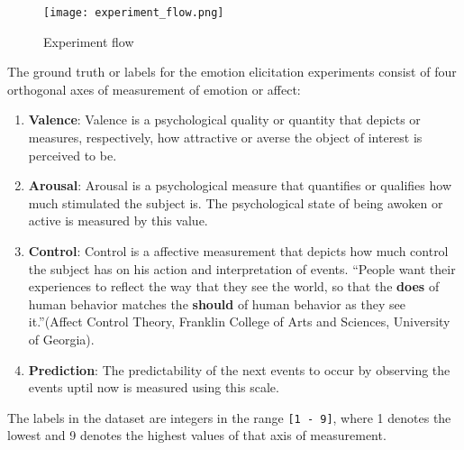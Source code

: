 \begin{figure}[H]
\centering
\texttt{[image: experiment\_flow.png]}
\caption{Experiment flow}
\label{fig-4-3}
\end{figure}

The ground truth or labels for the emotion elicitation experiments consist of four orthogonal axes of measurement of emotion or affect:
\begin{enumerate}
    \item \textbf{Valence}: Valence is a psychological quality or quantity that depicts or measures, respectively, how attractive or averse the object of interest is perceived to be.
    \item \textbf{Arousal}: Arousal is a psychological measure that quantifies or qualifies how much stimulated the subject is. The psychological state of being awoken or active is measured by this value.
    \item \textbf{Control}: Control is a affective measurement that depicts how much control the subject has on his action and interpretation of events. ``People want their experiences to reflect the way that they see the world, so that the \textbf{does} of human behavior matches the \textbf{should} of human behavior as they see it.''(Affect Control Theory, Franklin College of Arts and Sciences, University of Georgia).
    \item \textbf{Prediction}: The predictability of the next events to occur by observing the events uptil now is measured using this scale.
\end{enumerate}
The labels in the dataset are integers in the range \texttt{[1 - 9]}, where 1 denotes the lowest and 9 denotes the highest values of that axis of measurement. 